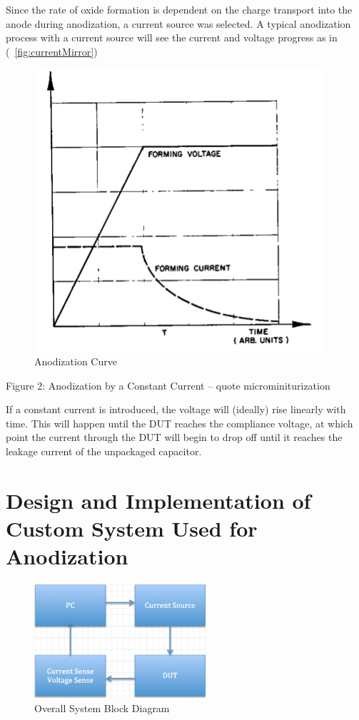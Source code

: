 \documentclass[journal]{IEEEtran}
\begin{document}
Since the rate of oxide formation is dependent on the charge transport into the anode during anodization, a current source was selected. A typical anodization process with a current source will see the current and voltage progress as in (~\ref{fig:currentMirror})
 

\begin{figure}[here]
\centering
\includegraphics{anodCurve}
\caption{Anodization Curve}
\label{fig:anodCurve}
\end{figure}
Figure 2: Anodization by a Constant Current – quote microminiturization

If a constant current is introduced, the voltage will (ideally) rise linearly with time. This will happen until the DUT reaches the compliance voltage, at which point the current through the DUT will begin to drop off until it reaches the leakage current of the unpackaged capacitor. 

\section{Design and Implementation of Custom System Used for Anodization}

\begin{figure}[here]
\centering
\includegraphics[width=2.5in]{blockDiagram}
\caption{Overall System Block Diagram}
\label{fig:blockDiagram}
\end{figure}
\end{document}
